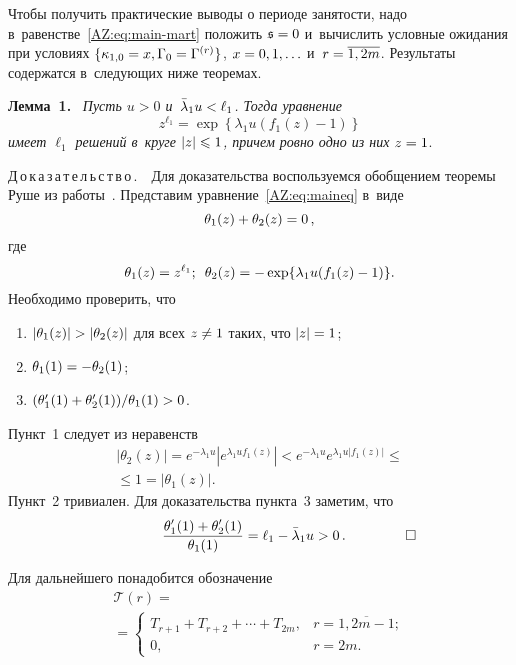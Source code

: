 \begin{multicols}{2}
\smallskip

Чтобы получить практические выводы о периоде занятости, надо в~равенстве~\eqref{AZ:eq:main-mart} положить 
$\mathfrak s\hm=0$ и~вычислить условные ожидания
при условиях $\{\kappa_{1,0}\hm=x, \Gamma_0\hm=\Gamma^{(r)}\}$, $x\hm=0, 1, \ldots$ и~$r\hm=\overline{1, 2m}$. 
Результаты содержатся в~следующих ниже теоремах.

\smallskip

\noindent
\textbf{Лемма~1.}\
 \textit{Пусть $u>0$ и~$\bar\lambda_1 u\hm<\ell_1$. Тогда уравнение}
  \begin{equation}
    z^{\ell_1}=\exp\left\{ \lambda_1 u  \left(f_1(z)-1\right)\right\}
    \label{AZ:eq:maineq}
  \end{equation}
 \textit{имеет $\ell_1$ решений в~круге $|z|\hm\leqslant1$, причем ровно одно из них 
$z\hm=1$}.

\noindent
Д\,о\,к\,а\,з\,а\,т\,е\,л\,ь\,с\,т\,в\,о\,.\ \
  Для доказательства воспользуемся обобщением теоремы Руше из работы~\cite{Klimenok}. Представим уравнение~\eqref{AZ:eq:maineq} в~виде
  $$
  \theta_1(z)\hm+\theta_2(z)\hm=0\,,
  $$ 
  где 
  $$
  \theta_1(z)=z^{\ell_1}; \enskip
\theta_2(z)\hm=-\exp\{\lambda_1
  u(f_1(z)-1)\}.
  $$
   Необходимо проверить, что 
   \begin{enumerate}[(1)]
   \item $|\theta_1(z)|\hm>|\theta_2(z)|$ для
  всех $z\hm\neq 1$ таких, что $|z|\hm=1$; 
  \item $\theta_1(1)\hm=-\theta_2(1)$; 
  \item $(\theta_1'(1)+\theta_2'(1))/\theta_1(1)\hm>0$.
  \end{enumerate}
  
   Пункт~1 следует из неравенств
\begin{multline*}
  |\theta_2(z)| = e^{-\lambda_1 u} \left\vert e^{\lambda_1 u f_1(z)} \right\vert <
  e^{-\lambda_1 u}  e^{\lambda_1 u |f_1(z)|}  \leqslant{}\\
  {}\leqslant 1=|\theta_1(z)|.
  \end{multline*}
  Пункт~2 тривиален. Для доказательства пункта~3 заметим, что
  $$
  \hspace{15mm}\fr{\theta_1'(1)+\theta_2'(1)}{\theta_1(1)}=\ell_1-\bar \lambda_1 u>0\,.\hspace{15mm}\square
  $$


Для дальнейшего понадобится обозначение
\begin{multline*}
\mathcal T(r)={}\\
{}=
\begin{cases}
  T_{r+1}+T_{r+2}+\cdots+T_{2m}, &\!\! r=\overline{1, 2m-1};\\
    0, & \! \!r=2m.
\end{cases}
\end{multline*}


\end{multicols}
